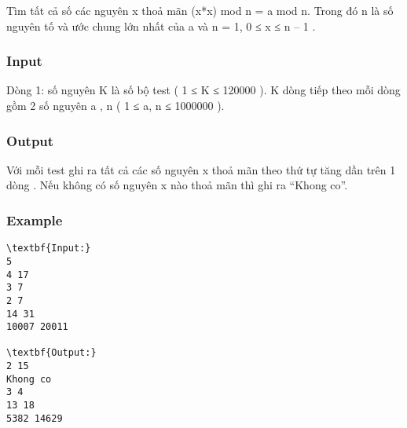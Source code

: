 



   Tìm tất cả số các nguyên x thoả mãn (x*x) mod n = a mod n. Trong đó n là số nguyên tố và ước chung lớn nhất của a và n = 1, 0 ≤ x ≤ n – 1 .  

\subsubsection{   Input  }

   Dòng 1: số nguyên K là số bộ test ( 1 ≤ K ≤ 120000 ). K dòng tiếp theo mỗi dòng gồm 2 số nguyên a , n ( 1 ≤ a, n ≤ 1000000 ).  

\subsubsection{   Output  }

   Với mỗi test ghi ra tất cả các số nguyên x thoả mãn theo thứ tự tăng dần trên 1 dòng . Nếu không có số nguyên x nào thoả mãn thì ghi ra “Khong co”.  

\subsubsection{   Example  }
\begin{verbatim}
\textbf{Input:}
5
4 17
3 7
2 7
14 31
10007 20011

\textbf{Output:}
2 15
Khong co
3 4
13 18
5382 14629
\end{verbatim}